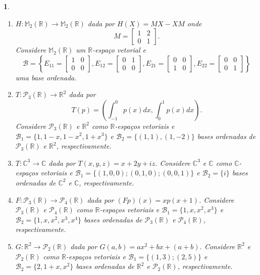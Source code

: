 \documentclass[12pt]{exam}
\newtheorem{exercicio}{}
\newcommand{\real}{\mathbb{R}}
\newcommand{\complex}{\mathbb{C}}
\newcommand{\cp}[1]{\mathbb{#1}}
\begin{document}
\begin{exercicio}
\begin{enumerate}[label=({\alph*})]
    \item $H : \cp{M}_2(\real) \to \cp{M}_2(\real)$ dada por $H(X) = MX - XM$ onde
    \[
      M = \begin{bmatrix}
        1 & 2\\
        0 & 1
      \end{bmatrix}.
    \]
    Considere $\cp{M}_2(\real)$ um $\real$-espa\c{c}o vetorial e
    \[
        \mathcal{B} = \left\{E_{11} = \begin{bmatrix}
          1 & 0\\0 & 0
        \end{bmatrix}, E_{12} = \begin{bmatrix}
          0 & 1\\0 & 0
        \end{bmatrix}, E_{21} = \begin{bmatrix}
          0 & 0\\1 & 0
        \end{bmatrix}, E_{22} = \begin{bmatrix}
          0 & 0\\0 & 1
        \end{bmatrix}\right\}
    \]
    uma base ordenada.

    \item $T : \mathcal{P}_3(\real) \to \real^2$ dada por
    \[
      T(p) = \left(\int_{-1}^0p(x)dx, \int_0^1p(x)dx\right).
    \]
    Considere $\mathcal{P}_3(\real)$ e $\real^2$ como $\real$-espa\c{c}os vetoriais e $\mathcal{B}_1 = \{1, 1-x, 1 - x^2, 1 + x^3\}$ e $\mathcal{B}_2 = \{(1,1), (1,-2)\}$ bases ordenadas de $\mathcal{P}_3(\real)$ e $\real^2$, respectivamente.
    
    \item $T : \complex^3 \to \complex$ dada por $T(x,y,z) = x + 2y + iz$. Considere $\complex^3$ e $\complex$ como $\complex$-espa\c{c}os vetoriais e $\mathcal{B}_1 = \{(1,0,0); (0,1,0); (0,0,1)\}$ e $\mathcal{B}_2 = \{i\}$ bases ordenadas de $\complex^2$ e $\complex$, respectivamente.
    
    \item $F : \mathcal{P}_3(\real) \to \mathcal{P}_4(\real)$ dada por $(Fp)(x) = xp(x + 1)$. Considere $\mathcal{P}_3(\real)$ e $\mathcal{P}_4(\real)$ como $\real$-espa\c{c}os vetoriais e $\mathcal{B}_1 = \{1, x, x^2, x^3\}$ e $\mathcal{B}_2 = \{1, x, x^2, x^3, x^4\}$ bases ordenadas de $\mathcal{P}_3(\real)$ e $\mathcal{P}_4(\real)$, respectivamente.
    
    \item $G : \real^2 \to \mathcal{P}_2(\real)$ dada por $G(a,b) = ax^2 + bx + (a + b)$. Considere $\real^2$ e $\mathcal{P}_2(\real)$ como $\real$-espa\c{c}os vetoriais e $\mathcal{B}_1 = \{(1,3); (2,5)\}$ e $\mathcal{B}_2 = \{2, 1 + x, x^2\}$ bases ordenadas de $\real^2$ e $\mathcal{P}_2(\real)$, respectivamente.


\end{enumerate}
\end{exercicio}
\end{document}
